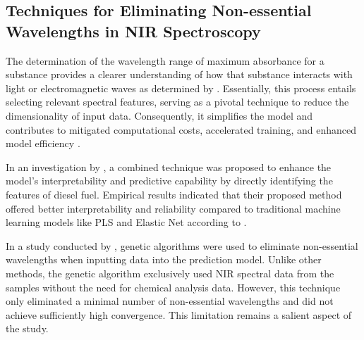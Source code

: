 \documentclass[10pt, a4paper, oneside]{article}
\begin{document}
\subsection{Techniques for Eliminating Non-essential Wavelengths in NIR Spectroscopy}
The determination of the wavelength range of maximum absorbance for a substance provides a clearer understanding of how that substance interacts with light or electromagnetic waves as determined by \cite{pavia2015introduction}. Essentially, this process entails selecting relevant spectral features, serving as a pivotal technique to reduce the dimensionality of input data. Consequently, it simplifies the model and contributes to mitigated computational costs, accelerated training, and enhanced model efficiency \cite{chandrashekar2014survey}. 

In an investigation by \cite{yu2023novel}, a combined technique was proposed to enhance the model's interpretability and predictive capability by directly identifying the features of diesel fuel. Empirical results indicated that their proposed method offered better interpretability and reliability compared to traditional machine learning models like PLS and Elastic Net according to \cite{hien2021keyphrase}.

In a study conducted by \cite{mamouei2020comparison}, genetic algorithms were used to eliminate non-essential wavelengths when inputting data into the prediction model. Unlike other methods, the genetic algorithm exclusively used NIR spectral data from the samples without the need for chemical analysis data. However, this technique only eliminated a minimal number of non-essential wavelengths and did not achieve sufficiently high convergence. This limitation remains a salient aspect of the study.
\end{document}
